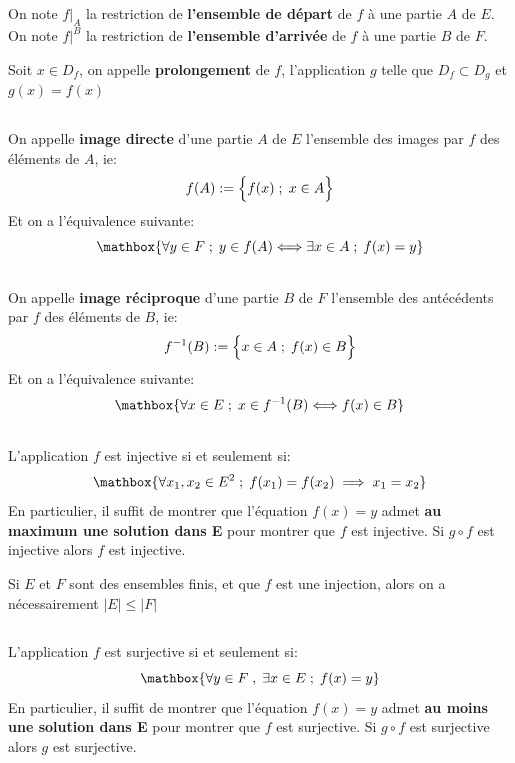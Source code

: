 \subsection*{}
On note \(f|_A\) la restriction de \textbf{l'ensemble de départ} de \(f\) à une partie \(A\) de \(E\).\+
On note \(f|^B\) la restriction de \textbf{l'ensemble d'arrivée} de \(f\) à une partie \(B\) de \(F\).\<

Soit \(x \in D_f\), on appelle \textbf{prolongement} de \(f\), l'application \(g\) telle que \(D_f \subset D_g\) et \(g(x) = f(x)\)
\subsection*{}
On appelle \textbf{image directe} d'une partie \(A\) de \(E\) l'ensemble des images par \(f\) des éléments de \(A\), ie:
\[
    f(A) := \Bigl\{ f(x) \; ; \; x \in A \Bigl\}   
\]
Et on a l'équivalence suivante:
\[
    \mathbox{
       \forall y \in F \; ; \; y \in f(A) \Longleftrightarrow \exists x \in A \; ; \; f(x) = y
    }
\]
\subsection*{}
On appelle \textbf{image réciproque} d'une partie \(B\) de \(F\) l'ensemble des antécédents par \(f\) des éléments de \(B\), ie:
\[
    f^{-1}(B) := \Bigl\{ x \in A \; ; \; f(x) \in B \Bigl\}   
\]
Et on a l'équivalence suivante:
\[
    \mathbox{
       \forall x \in E \; ; \; x \in f^{-1}(B) \Longleftrightarrow f(x) \in B
    }
\]
\subsection*{}
L'application \(f\) est injective si et seulement si:
\[
    \mathbox{
        \forall x_1, x_2 \in E^2 \; ; \; f(x_1) = f(x_2) \implies x_1 = x_2 
    }
\]
En particulier, il suffit de montrer que l'équation \(f(x) = y\) admet \textbf{au maximum une solution dans E} pour montrer que \(f\) est injective.\+
Si \(g \circ f\) est injective alors \(f\) est injective.\<

Si \(E\) et \(F\) sont des ensembles finis, et que \(f\) est une injection, alors on a nécessairement \(|E| \leq |F|\)
\subsection*{}
L'application \(f\) est surjective si et seulement si:
\[
    \mathbox{
        \forall y \in F \; , \; \exists x \in E \; ; \; f(x) = y  
    }
\]
En particulier, il suffit de montrer que l'équation \(f(x) = y\) admet \textbf{au moins une solution dans E} pour montrer que \(f\) est surjective.\+
Si \(g \circ f\) est surjective alors \(g\) est surjective.\<

